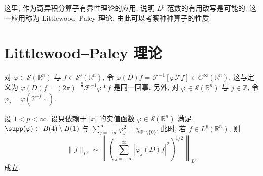 
这里, 作为奇异积分算子有界性理论的应用, 说明 $L^{p}$ 范数的有用改写是可能的. 这一应用称为 Littlewood--Paley 理论, 由此可以考察种种算子的性质.

\section{Littlewood--Paley 理论}\label{sec:6.1}

对 $\varphi \in \mathcal{S}(\mathbb{R}^{n})$ 与 $f \in \mathcal{S}'(\mathbb{R}^{n})$, 令 $\varphi(D)f = \mathcal{F}^{-1}[\varphi\mathcal{F}f] \in C^{\infty}(\mathbb{R}^{n})$. 这与定义为 $\varphi(D)f = (2\pi)^{-\frac{n}{2}}\mathcal{F}^{-1}\varphi * f$ 是同一回事. 另外, 对 $\varphi \in \mathcal{S}(\mathbb{R}^{n})$ 与 $j \in \mathbb{Z}$, 令 $\varphi_{j} = \varphi(2^{-j}\,\cdot\,)$.

\begin{theorem}\label{thm:6.1}
设 $1 < p < \infty$. 设只依赖于 $|x|$ 的实值函数 $\varphi \in \mathcal{S}(\mathbb{R}^{n})$ 满足 $\supp(\varphi) \subset B(4) \setminus B(1)$ 与 $\sum_{j=-\infty}^{\infty}\varphi_{j}^{2} = \chi_{\mathbb{R}^{n}\setminus\{0\}}$. 此时, 若 $f \in L^{p}(\mathbb{R}^{n})$, 则
\[
\|f\|_{L^{p}} \sim \left\|\left(\sum_{j=-\infty}^{\infty}|\varphi_{j}(D)f|^{2}\right)^{1/2}\right\|_{L^{p}}
\]
成立.
\end{theorem}

